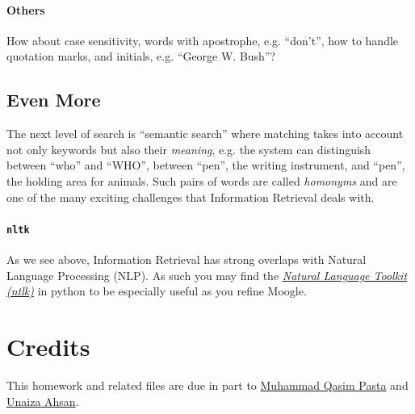 \documentclass[addpoints]{exam}
\begin{document}
\paragraph{Others} How about case sensitivity, words with apostrophe, e.g. ``don't'', how to handle quotation marks, and initials, e.g. ``George W. Bush''?

\subsection{Even More} The next level of search is ``semantic search'' where matching takes into account not only keywords but also their \textit{meaning}, e.g. the system can distinguish between ``who'' and ``WHO'', between ``pen'', the writing instrument, and ``pen'', the holding area for animals. Such pairs of words are called \textit{homonyms} and are one of the many exciting challenges that Information Retrieval deals with.

\paragraph{\texttt{nltk}} As we see above, Information Retrieval has strong overlaps with Natural Language Processing (NLP). As such you may find the \href{https://www.nltk.org}{\textit{Natural Language Toolkit (ntlk)}} in python to be especially useful as you refine Moogle.

\section*{Credits}

This homework and related files are due in part to \href{http://qasimpasta.info}{Muhammad Qasim Pasta} and \href{http://unaizahsan.com}{Unaiza Ahsan}.
\end{document}
